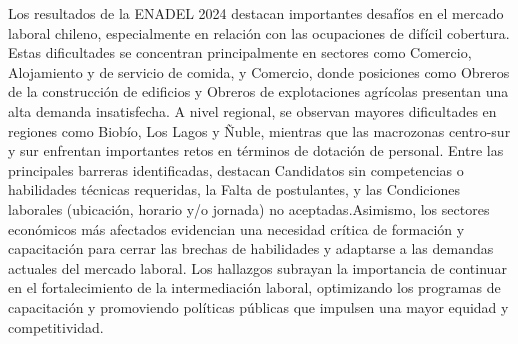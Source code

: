 \documentclass[
  11pt,
]{article}
\begin{document}
Los resultados de la ENADEL 2024 destacan importantes desafíos en el
mercado laboral chileno, especialmente en relación con las ocupaciones
de difícil cobertura. Estas dificultades se concentran principalmente en
sectores como Comercio, Alojamiento y de servicio de comida, y Comercio,
donde posiciones como Obreros de la construcción de edificios y Obreros
de explotaciones agrícolas presentan una alta demanda insatisfecha. A
nivel regional, se observan mayores dificultades en regiones como
Biobío, Los Lagos y Ñuble, mientras que las macrozonas centro-sur y sur
enfrentan importantes retos en términos de dotación de personal. Entre
las principales barreras identificadas, destacan Candidatos sin
competencias o habilidades técnicas requeridas, la Falta de postulantes,
y las Condiciones laborales (ubicación, horario y/o jornada) no
aceptadas.Asimismo, los sectores económicos más afectados evidencian una
necesidad crítica de formación y capacitación para cerrar las brechas de
habilidades y adaptarse a las demandas actuales del mercado laboral. Los
hallazgos subrayan la importancia de continuar en el fortalecimiento de
la intermediación laboral, optimizando los programas de capacitación y
promoviendo políticas públicas que impulsen una mayor equidad y
competitividad. \newpage

\end{document}
